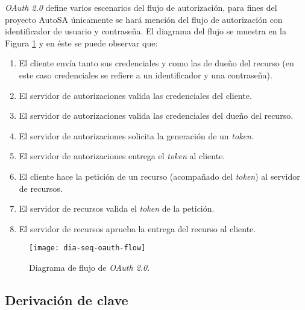 \textit{OAuth 2.0} define varios escenarios del flujo de autorización, para fines del proyecto AutoSA únicamente se hará mención del flujo de autorización con identificador de usuario y contraseña\cite{OAuthRFC, OAuth2Identity}. El diagrama del flujo se muestra en la Figura \ref{fig:dia-seq-oauth-flow} y en éste se puede observar que:
\begin{enumerate}
	\item El cliente envía tanto sus credenciales y como las de dueño del recurso (en este caso credenciales se refiere a un identificador y una contraseña).
	\item El servidor de autorizaciones valida las credenciales del cliente.
	\item El servidor de autorizaciones valida las credenciales del dueño del recurso.
	\item El servidor de autorizaciones solicita la generación de un \textit{token}.
	\item El servidor de autorizaciones entrega el \textit{token} al cliente.
	\item El cliente hace la petición de un recurso (acompañado del \textit{token}) al servidor de recursos.
	\item El servidor de recursos valida el \textit{token} de la petición. 
	\item El servidor de recursos aprueba la entrega del recurso al cliente.
\end{enumerate}

\begin{figure}[h]
	\centering
	\texttt{[image: dia-seq-oauth-flow]}
	\caption{Diagrama de flujo de \textit{OAuth 2.0}.}
	\label{fig:dia-seq-oauth-flow}
\end{figure}

\subsection{Derivación de clave}\label{sec:key-derivation}

